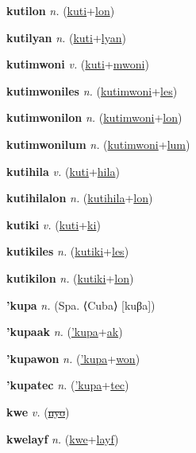 \textbf{\hypertarget{kutilon}{kutilon}} \textit{n.} (\hyperlink{kuti}{kuti}+\allowbreak \hyperlink{lon}{lon})


\textbf{\hypertarget{kutilyan}{kutilyan}} \textit{n.} (\hyperlink{kuti}{kuti}+\allowbreak \hyperlink{lyan}{lyan})


\textbf{\hypertarget{kutimwoni}{kutimwoni}} \textit{v.} (\hyperlink{kuti}{kuti}+\allowbreak \hyperlink{mwoni}{mwoni})


\textbf{\hypertarget{kutimwoniles}{kutimwoniles}} \textit{n.} (\hyperlink{kutimwoni}{kutimwoni}+\allowbreak \hyperlink{les}{les})


\textbf{\hypertarget{kutimwonilon}{kutimwonilon}} \textit{n.} (\hyperlink{kutimwoni}{kutimwoni}+\allowbreak \hyperlink{lon}{lon})


\textbf{\hypertarget{kutimwonilum}{kutimwonilum}} \textit{n.} (\hyperlink{kutimwoni}{kutimwoni}+\allowbreak \hyperlink{lum}{lum})


\textbf{\hypertarget{kutihila}{kutihila}} \textit{v.} (\hyperlink{kuti}{kuti}+\allowbreak \hyperlink{hila}{hila})


\textbf{\hypertarget{kutihilalon}{kutihilalon}} \textit{n.} (\hyperlink{kutihila}{kutihila}+\allowbreak \hyperlink{lon}{lon})


\textbf{\hypertarget{kutiki}{kutiki}} \textit{v.} (\hyperlink{kuti}{kuti}+\allowbreak \hyperlink{ki}{ki})


\textbf{\hypertarget{kutikiles}{kutikiles}} \textit{n.} (\hyperlink{kutiki}{kutiki}+\allowbreak \hyperlink{les}{les})


\textbf{\hypertarget{kutikilon}{kutikilon}} \textit{n.} (\hyperlink{kutiki}{kutiki}+\allowbreak \hyperlink{lon}{lon})


\textbf{\hypertarget{'kupa}{'kupa}} \textit{n.} (Spa. ⟨Cuba⟩ [kuβa])


\textbf{\hypertarget{'kupaak}{'kupaak}} \textit{n.} (\hyperlink{'kupa}{'kupa}+\allowbreak \hyperlink{ak}{ak})


\textbf{\hypertarget{'kupawon}{'kupawon}} \textit{n.} (\hyperlink{'kupa}{'kupa}+\allowbreak \hyperlink{won}{won})


\textbf{\hypertarget{'kupatec}{'kupatec}} \textit{n.} (\hyperlink{'kupa}{'kupa}+\allowbreak \hyperlink{tec}{tec})


\textbf{\hypertarget{kwe}{kwe}} \textit{v.} (\hyperlink{nyo}{\sout{nyo}})


\textbf{\hypertarget{kwelayf}{kwelayf}} \textit{n.} (\hyperlink{kwe}{kwe}+\allowbreak \hyperlink{layf}{layf})


